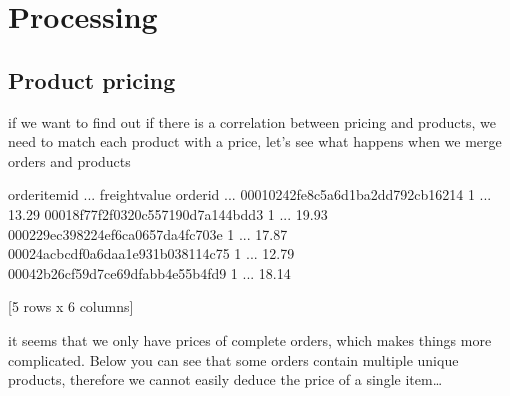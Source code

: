\documentclass[letterpaper,10pt,english]{jupyterBook}
\begin{document}
\section{Processing}
\label{\detokenize{c7_case_studies/Olist:processing}}

\subsection{Product pricing}
\label{\detokenize{c7_case_studies/Olist:product-pricing}}
\sphinxAtStartPar
if we want to find out if there is a correlation between pricing and products, we need to match each product with a price, let’s see what happens when we merge orders and products

\begin{sphinxVerbatim}[commandchars=\\\{\}]
\end{sphinxVerbatim}

\begin{sphinxVerbatim}[commandchars=\\\{\}]
                                  order\PYGZus{}item\PYGZus{}id  ... freight\PYGZus{}value
order\PYGZus{}id                                         ...              
00010242fe8c5a6d1ba2dd792cb16214              1  ...         13.29
00018f77f2f0320c557190d7a144bdd3              1  ...         19.93
000229ec398224ef6ca0657da4fc703e              1  ...         17.87
00024acbcdf0a6daa1e931b038114c75              1  ...         12.79
00042b26cf59d7ce69dfabb4e55b4fd9              1  ...         18.14

[5 rows x 6 columns]
\end{sphinxVerbatim}

\sphinxAtStartPar
it seems that we only have prices of complete orders, which makes things more complicated. Below you can see that some orders contain multiple unique products, therefore we cannot easily deduce the price of a single item…

\begin{sphinxVerbatim}[commandchars=\\\{\}]
  
\end{sphinxVerbatim}
\end{document}
